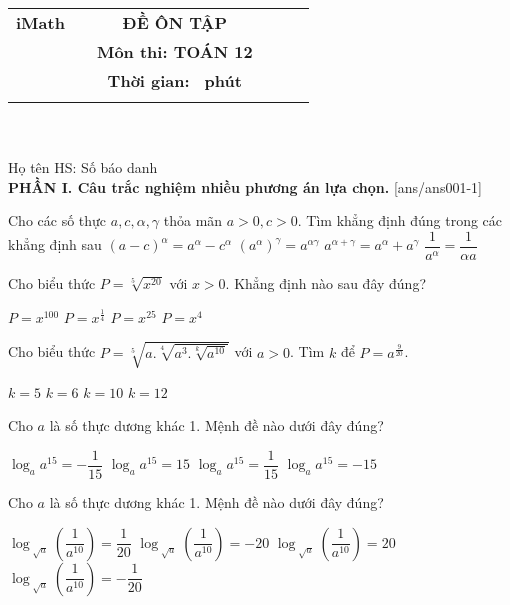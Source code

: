 \documentclass[12pt,a4paper]{article}
\newcommand{\tenso}{iMath}
\newcommand{\tentruong}{}
\newcommand{\tenkythi}{ĐỀ ÔN TẬP}
\newcommand{\tenmonthi}{Môn thi: TOÁN 12}
\newcommand{\thoigian}{}
\newcommand{\tieude}[1]{
   \begin{tabular}{cm{3cm}cm{3cm}cm{3cm}}
    {\bf \tenso} & & {\bf \tenkythi} \\
    {\bf \tentruong} & & {\bf \tenmonthi}\\
    && {\bf Thời gian: \bf \thoigian \, phút}\\
    && { \fbox{\bf Mã đề: #1}}
   \end{tabular}\\\\
    
   {Họ tên HS: \dotfill Số báo danh \dotfill}\\
}
\newcommand{\chantrang}[2]{\rfoot{Trang \thepage $-$ Mã đề #2}}
\begin{document}


\tieude{001}
\chantrang{\pageref{LastPage}}{001}
\setcounter{page}{1}
{\bf PHẦN I. Câu trắc nghiệm nhiều phương án lựa chọn.}
\setcounter{ex}{0}
[ans/ans001-1]
\begin{ex}
 Cho các số thực ${a,c,\alpha,\gamma}$ thỏa mãn $a>0,c>0$. Tìm khẳng định đúng trong các khẳng định sau 
\choice
{ $\left(a - c\right)^{\alpha}=a^{\alpha}-c^{\alpha}$ }
   { \True $(a^{\alpha})^{\gamma}=a^{\alpha \gamma}$ }
     { $a^{\alpha + \gamma}=a^{\alpha}+a^{\gamma}$ }
    { $\dfrac{1}{a^{\alpha}}=\dfrac{1}{\alpha a}$ }
\end{ex}

\begin{ex}
 Cho biểu thức $P=\sqrt[5] {x^{20}}$ với $x>0$. Khẳng định nào sau đây đúng?
 
\choice
{ $P={x^{100}}$ }
   { $P={x^{\frac{1}{4}}}$ }
     { $P={x^{25}}$ }
    { \True $P={x^{4}}$ }
\end{ex}

\begin{ex}
 Cho biểu thức $P=\sqrt[5] {a.\sqrt[4]{ a^3.\sqrt[k]{a^{10}} } }$ với $a>0$. Tìm ${k}$ để $P=a^{\tfrac{9}{20}}$.
 
\choice
{ \True ${k= 5}$ }
   { ${k= 6}$ }
     { ${k= 10}$ }
    { ${k= 12}$ }
\end{ex}

\begin{ex}
  Cho $a$ là số thực dương khác 1. Mệnh đề nào dưới đây đúng?
 
\choice
{ $\log_a a^{15}=-\dfrac{1}{15}$ }
   { \True $\log_a a^{15}=15$ }
     { $\log_a a^{15}=\dfrac{1}{15}$ }
    { $\log_a a^{15}=-15$ }
\end{ex}

\begin{ex}
  Cho $a$ là số thực dương khác 1. Mệnh đề nào dưới đây đúng?
 
\choice
{ $\log_{\sqrt[{}]{a}} \left(\dfrac{1}{ a^{10} }\right)=\dfrac{1}{20}$ }
   { \True $\log_{\sqrt[{}]{a}} \left(\dfrac{1}{ a^{10} }\right)=-20$ }
     { $\log_{\sqrt[{}]{a}} \left(\dfrac{1}{ a^{10} }\right)=20$ }
    { $\log_{\sqrt[{}]{a}} \left(\dfrac{1}{ a^{10} }\right)=-\dfrac{1}{20}$ }
\end{ex}
\end{document}
